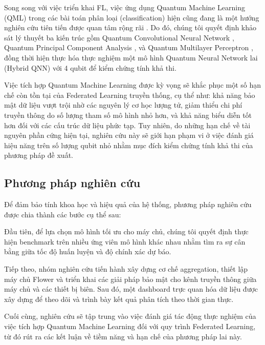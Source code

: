 Song song với việc triển khai FL, việc ứng dụng Quantum Machine Learning (QML) trong các bài toán phân loại (classification) hiện cũng đang là một hướng nghiên cứu tiên tiến được quan tâm rộng rãi . Do đó, chúng tôi quyết định khảo sát lý thuyết ba kiến trúc gồm Quantum Convolutional Neural Network \cite{Cong_2019}, Quantum Principal Component Analysis \cite{Lloyd_2014}, và Quantum Multilayer Perceptron \cite{shao2018quantummodelmultilayerperceptron}, đồng thời hiện thực hóa thực nghiệm một mô hình Quantum Neural Network lai (Hybrid QNN) với 4 qubit để kiểm chứng tính khả thi.

Việc tích hợp Quantum Machine Learning được kỳ vọng sẽ khắc phục một số hạn chế còn tồn tại của Federated Learning truyền thống, cụ thể như: khả năng bảo mật dữ liệu vượt trội nhờ các nguyên lý cơ học lượng tử, giảm thiểu chi phí truyền thông do số lượng tham số mô hình nhỏ hơn, và khả năng biểu diễn tốt hơn đối với các cấu trúc dữ liệu phức tạp. Tuy nhiên, do những hạn chế về tài nguyên phần cứng hiện tại, nghiên cứu này sẽ giới hạn phạm vi ở việc đánh giá hiệu năng trên số lượng qubit nhỏ nhằm mục đích kiểm chứng tính khả thi của phương pháp đề xuất.

\subsection{Phương pháp nghiên cứu}

Để đảm bảo tính khoa học và hiệu quả của hệ thống, phương pháp nghiên cứu được chia thành các bước cụ thể sau:

Đầu tiên, để lựa chọn mô hình tối ưu cho máy chủ, chúng tôi quyết định thực hiện benchmark trên nhiều ứng viên mô hình khác nhau nhằm tìm ra sự cân bằng giữa tốc độ huấn luyện và độ chính xác dự báo.

Tiếp theo, nhóm nghiên cứu tiến hành xây dựng cơ chế aggregation, thiết lập máy chủ Flower và triển khai các giải pháp bảo mật cho kênh truyền thông giữa máy chủ và các thiết bị biên. Sau đó, một dashboard trực quan hóa dữ liệu được xây dựng để theo dõi và trình bày kết quả phân tích theo thời gian thực.

Cuối cùng, nghiên cứu sẽ tập trung vào việc đánh giá tác động thực nghiệm của việc tích hợp Quantum Machine Learning đối với quy trình Federated Learning, từ đó rút ra các kết luận về tiềm năng và hạn chế của phương pháp lai này.